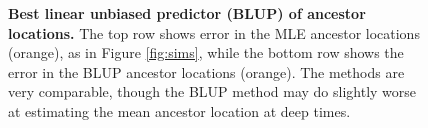 \documentclass[12pt]{article}
\begin{document}
\begin{figure}[!htb]
\caption{
\textbf{Best linear unbiased predictor (BLUP) of ancestor locations.} The top row shows error in the MLE ancestor locations (orange), as in Figure \ref{fig:sims}, while the bottom row shows the error in the BLUP ancestor locations (orange). The methods are very comparable, though the BLUP method may do slightly worse at estimating the mean ancestor location at deep times.
}

\label{fig:blups}
\end{figure}


\begin{figure}[!htb]

  \begin{center}
\end{center}
\end{figure}
\end{document}
